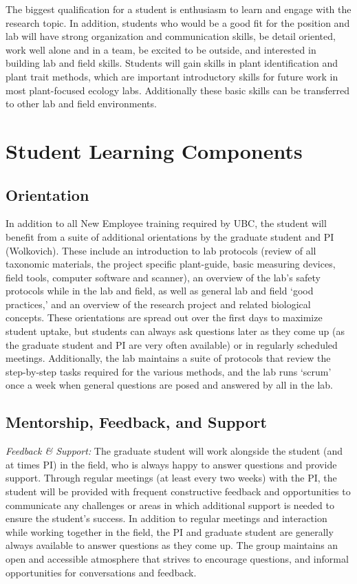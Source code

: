 \documentclass[11pt, oneside]{article}   	%
\begin{document}
The biggest qualification for a student is enthusiasm to learn and engage with the research topic. In addition, students who would be a good fit for the position and lab will have strong organization and communication skills, be detail oriented, work well alone and in a team, be excited to be outside, and interested in building lab and field skills. Students will gain skills in plant identification and plant trait methods, which are important introductory skills for future work in most plant-focused ecology labs. Additionally these basic skills can be transferred to other lab and field environments. 

\section {Student Learning Components}

\subsection {Orientation}
In addition to all New Employee training required by UBC, the student will benefit from a suite of additional orientations by the graduate student and PI (Wolkovich). These include an introduction to lab protocols (review of all taxonomic materials, the project specific plant-guide, basic measuring devices, field tools, computer software and scanner), an overview of the lab's safety protocols while in the lab and field, as well as general lab and field `good practices,' and an overview of the research project and related biological concepts. These orientations are spread out over the first days to maximize student uptake, but students can always ask questions later as they come up (as the graduate student and PI are very often available) or in regularly scheduled meetings. Additionally, the lab maintains a suite of protocols that review the step-by-step tasks required for the various methods, and the lab runs `scrum' once a week when general questions are posed and answered by all in the lab.

\subsection{Mentorship, Feedback, and Support}
\noindent \emph{Feedback \& Support:} The graduate student will work alongside the student (and at times PI) in the field, who is always happy to answer questions and provide support. Through regular meetings (at least every two weeks) with the PI, the student will be provided with frequent constructive feedback and opportunities to communicate any challenges or areas in which additional support is needed to ensure the student's success. In addition to regular meetings and interaction while working together in the field, the PI and graduate student are generally always available to answer questions as they come up. The group maintains an open and accessible atmosphere that strives to encourage questions, and informal opportunities for conversations and feedback.
\end{document}

